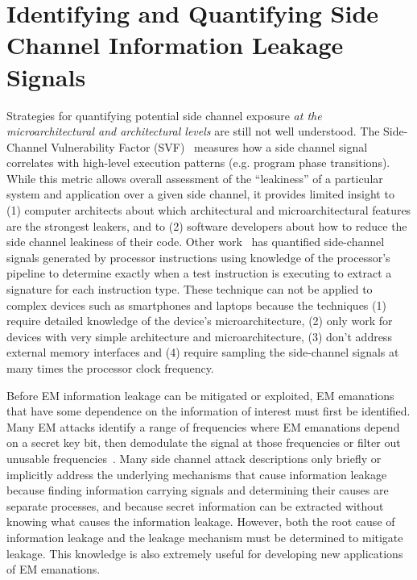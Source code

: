 \section{Identifying and Quantifying Side Channel Information Leakage Signals}

\label{sec:id_quant_em}
Strategies for quantifying potential side channel exposure {\em at the microarchitectural and architectural levels} are still not well understood. The Side-Channel Vulnerability Factor (SVF)~\cite{Demme_SVF_ISCA12,Demme_SVF_TopPicks12} measures how a side channel signal correlates with high-level execution patterns (e.g. program phase transitions). While this metric allows overall assessment of the ``leakiness'' of a particular system and application over a given side channel, it provides limited insight to (1) computer architects about which architectural and microarchitectural features are the strongest leakers, and to (2) software developers about how to reduce the side channel leakiness of their code. Other work~\cite{Goldack, eisenbarth2010, Quisquater2002} has quantified side-channel signals generated by processor instructions using knowledge of the processor's pipeline to determine exactly when a test instruction is executing to extract a signature for each instruction type. These technique can not be applied to complex devices such as smartphones and laptops because the techniques (1) require detailed knowledge of the device's microarchitecture, (2) only work for devices with very simple architecture and microarchitecture, (3) don't address external memory interfaces and (4) require sampling the side-channel signals at many times the processor clock frequency. 

Before EM information leakage can be mitigated or exploited, EM emanations that have some dependence on the information of interest must first be identified. Many EM attacks identify a range of frequencies where EM emanations depend on a secret key bit, then demodulate the signal at those frequencies or filter out unusable frequencies~\cite{gebotys2005,meynard2011,sugawara2009}. Many side channel attack descriptions only briefly or implicitly address the underlying mechanisms that cause information leakage because finding information carrying signals and determining their causes are separate processes, and because secret information can be extracted without knowing what causes the information leakage. However, both the root cause of information leakage and the leakage mechanism must be determined to mitigate leakage. This knowledge is also extremely useful for developing new applications of EM emanations.

